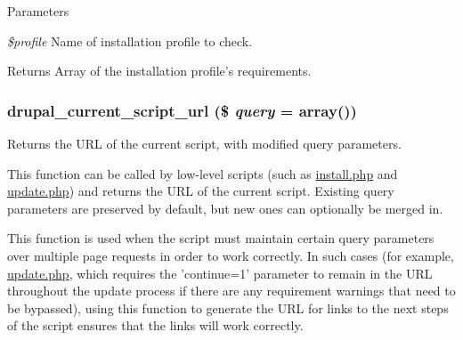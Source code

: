 \begin{DoxyParams}{Parameters}
\item[{\em \$profile}]Name of installation profile to check. \end{DoxyParams}
\begin{DoxyReturn}{Returns}
Array of the installation profile's requirements. 
\end{DoxyReturn}
\hypertarget{install_8inc_a75c4f99a27a5a65328abc0eaa1f928e3}{
\subsubsection[{drupal\_\-current\_\-script\_\-url}]{\setlength{\rightskip}{0pt plus 5cm}drupal\_\-current\_\-script\_\-url (\$ {\em query} = {\ttfamily array()})}}
\label{install_8inc_a75c4f99a27a5a65328abc0eaa1f928e3}
Returns the URL of the current script, with modified query parameters.

This function can be called by low-\/level scripts (such as \hyperlink{install_8php}{install.php} and \hyperlink{update_8php}{update.php}) and returns the URL of the current script. Existing query parameters are preserved by default, but new ones can optionally be merged in.

This function is used when the script must maintain certain query parameters over multiple page requests in order to work correctly. In such cases (for example, \hyperlink{update_8php}{update.php}, which requires the 'continue=1' parameter to remain in the URL throughout the update process if there are any requirement warnings that need to be bypassed), using this function to generate the URL for links to the next steps of the script ensures that the links will work correctly.


